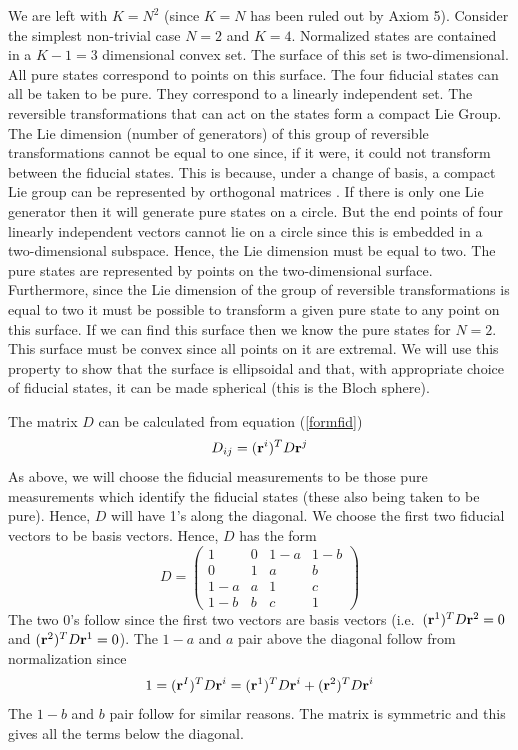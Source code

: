 \documentclass[10pt,twocolumn]{article}
\begin{document}
We are left with $K=N^2$ (since $K=N$ has been ruled out by Axiom 5).
Consider the simplest non-trivial case $N=2$ and $K=4$.  Normalized
states are contained in a $K-1=3$ dimensional convex set.  The surface
of this set is two-dimensional.  All pure states correspond to points on
this surface.  The four fiducial states can all be taken to be pure.  They
correspond to a linearly independent set.
The reversible transformations that can act on the states form a
compact Lie Group.  The Lie dimension (number of generators) of this
group of reversible transformations cannot be equal to one since, if
it were, it could not transform between the fiducial states. This is because,
under a change
of basis, a compact Lie group can be represented by
orthogonal matrices \cite{boerner}. If there
is only one Lie generator then it will generate pure states on a circle.  But
the end points of four linearly independent vectors cannot lie on a
circle since this is embedded in a two-dimensional subspace.  Hence, the
Lie dimension must be equal to two.  The pure states are
represented by points on the two-dimensional surface.  Furthermore,
since the Lie
dimension of the group of reversible transformations is equal to two
it must be possible to
transform a given pure state to any point on this surface.  If we can
find this surface then we know the pure states for $N=2$.  This surface
must be convex since all points on it are extremal.  We will use this
property to show that the surface is ellipsoidal and that, with
appropriate choice of fiducial states, it can be made spherical (this is
the Bloch sphere).

The matrix $D$ can be calculated from equation (\ref{formfid})
\[ D_{ij}= ({\bf r}^i)^T D {\bf r}^j  \]
As above, we will choose the fiducial measurements to be those pure
measurements which identify the fiducial
states (these also being taken to be pure).  Hence, $D$ will have 1's along
the diagonal.  We choose the first two fiducial vectors to be basis
vectors.  Hence, $D$ has the form
\begin{equation}\label{twodDsym}
D=\left( \begin{array}{cccc} 1 &  0  &  1-a & 1-b \\
                             0 &  1  &   a  &  b  \\
                             1-a &  a &   1  &  c  \\
                             1-b &  b &   c &  1   \end{array} \right)
\end{equation}
The two 0's follow since the first two vectors are basis vectors (i.e.\
$({\bf r}^1)^T D {\bf r}^2=0$ and $({\bf r}^2)^T D {\bf r}^1=0$).  The
$1-a$ and $a$ pair above the diagonal follow from normalization since
\begin{equation}
1=({\bf r}^I)^T D {\bf r}^i=({\bf r}^1)^T D {\bf r}^i +
({\bf r}^2)^T D {\bf r}^i
\end{equation}
The $1-b$ and $b$ pair follow for similar reasons.  The matrix is
symmetric and this gives all the terms below the diagonal.
\end{document}
